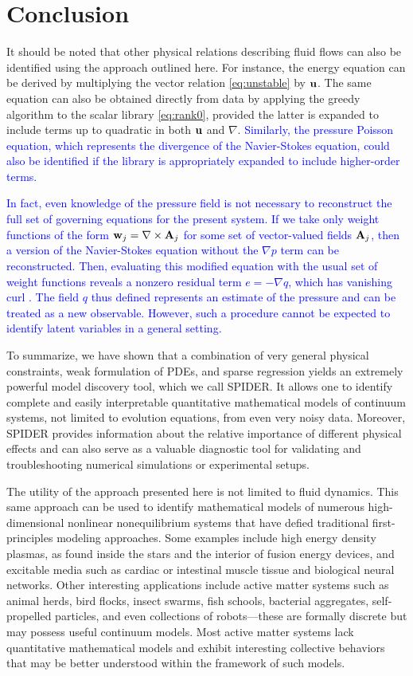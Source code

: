 \documentclass[9pt,twocolumn,twoside,lineno]{pnas-new}
\begin{document}
\section*{Conclusion}

It should be noted that other physical relations describing fluid flows can also be identified using the approach outlined here. For instance, the energy equation can be derived by multiplying the vector relation \eqref{eq:unstable} by ${\bf u}$. The same equation can also be obtained directly from data by applying the greedy algorithm to the scalar library \eqref{eq:rank0}, provided the latter is expanded to include terms up to quadratic in both ${\bf u}$ and $\nabla$. \textcolor{blue}{Similarly, the pressure Poisson equation, which represents the divergence of the Navier-Stokes equation, could also be identified if the library is appropriately expanded to include higher-order terms.}

\textcolor{blue}{In fact, even knowledge of the pressure field is not necessary to reconstruct the full set of governing equations for the present system. If we take only weight functions of the form ${\bf w}_j = \nabla \times {\bf A}_j$ for some set of vector-valued fields ${\bf A}_j$, then a version of the Navier-Stokes equation without the $\nabla p$ term can be reconstructed. Then, evaluating this modified equation with the usual set of weight functions reveals a nonzero residual term $e = -\nabla q$, which has vanishing curl \cite{reinbold2020}. The field $q$ thus defined represents an estimate of the pressure and can be treated as a new observable. However, such a procedure cannot be expected to identify latent variables in a general setting.}

To summarize, we have shown that a combination of very general physical constraints, weak formulation of PDEs, and sparse regression yields an extremely powerful model discovery tool, which we call SPIDER. It allows one to identify complete and easily interpretable quantitative mathematical models of continuum systems, not limited to evolution equations, from even very noisy data.
Moreover, SPIDER provides information about the relative importance of different physical effects and can also serve as a valuable diagnostic tool for validating and troubleshooting numerical simulations or experimental setups.

The utility of the approach presented here is not limited to fluid dynamics. This same approach can be used to identify mathematical models of numerous high-dimensional nonlinear nonequilibrium systems that have defied traditional first-principles modeling approaches. Some examples include high energy density plasmas, as found inside the stars and the interior of fusion energy devices, and excitable media such as cardiac or intestinal muscle tissue and biological neural networks. Other interesting applications include active matter systems such as animal herds, bird flocks, insect swarms, fish schools, bacterial aggregates, self-propelled particles, and even collections of robots---these are formally discrete but may possess useful continuum models. Most active matter systems lack quantitative mathematical models and exhibit interesting collective behaviors that may be better understood within the framework of such models.


\showacknow{} %


\end{document}
